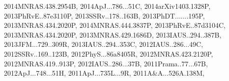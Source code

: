 \documentclass[12pt]{article}
\begin{document}
\begin{enumerate}
\begin{enumerate}
{2014MNRAS.438.2954B,%
2014ApJ...786...51C,%
2014arXiv1403.1328P,%
2013PhRvE..87e3110P,%
2013SSRv..178..163B,%
2013PhDT.......195P,%
2013MNRAS.434.2020P,%
2014MNRAS.444.3837P,%
2013PhRvE..87d3104C,%
2013MNRAS.434.2020P,%
2013MNRAS.429.1686D,%
2013IAUS..294..387B,%
2013JFM...729..309R,%
2013IAUS..294..353C,%
2012IAUS..286...49C,%
2012SSRv..169..123B,%
2012PhyS...86a8405R,%
2012MNRAS.423.2120P,%
2012MNRAS.419..913P,%
2012IAUS..286...37B,%
2011Prama..77...67B,%
2012ApJ...748...51H,%
2011ApJ...735L...9R,%
2011A&A...526A.138M,%
}
\end{enumerate}
\end{enumerate}
\end{document}
